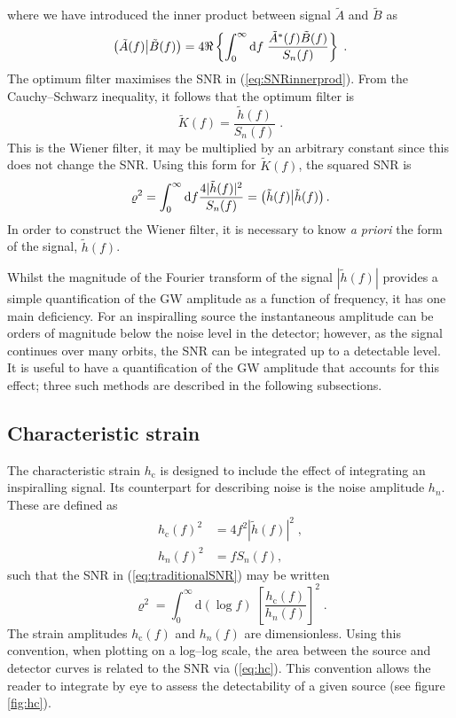 where we have introduced the inner product between signal $\tilde{A}$ and $\tilde{B}$ as \citep{Finn1992}
\begin{equation}\label{eq:snrinnerprod} \left({\tilde{A}(f)}\middle|{\tilde{B}(f)}\right) = 4\Re\left\{\int_{0}^{\infty}\mathrm{d}f\;\frac{\tilde{A}^{*}(f)\tilde{B}(f)}{S_{n}(f)}\right\} \; .\end{equation}
The optimum filter maximises the SNR in (\ref{eq:SNRinnerprod}). From the Cauchy--Schwarz inequality, it follows that the optimum filter is
\begin{equation}
\tilde{K}(f)=\frac{\tilde{h}(f)}{S_{n}(f)} \; .
\end{equation}
This is the Wiener filter, it may be multiplied by an arbitrary constant since this does not change the SNR. Using this form for $\tilde{K}(f)$, the squared SNR is
\begin{equation}
\varrho^2 = \int_0^\infty\mathrm{d}f \frac{4| \tilde{h}(f)|^{2}}{S_n(f)} = \left({\tilde{h}(f)}\middle|{\tilde{h}(f)}\right).
\label{eq:traditionalSNR} 
\end{equation}
In order to construct the Wiener filter, it is necessary to know \emph{a priori} the form of the signal, $\tilde{h}(f)$.

Whilst the magnitude of the Fourier transform of the signal $|\tilde{h}(f)|$ provides a simple quantification of the GW amplitude as a function of frequency, it has one main deficiency. For an inspiralling source the instantaneous amplitude can be orders of magnitude below the noise level in the detector; however, as the signal continues over many orbits, the SNR can be integrated up to a detectable level. It is useful to have a quantification of the GW amplitude that accounts for this effect; three such methods are described in the following subsections.

\subsection{Characteristic strain}\label{sec:character-strain}

The characteristic strain $h_\mathrm{c}$ is designed to include the effect of integrating an inspiralling signal. Its counterpart for describing noise is the noise amplitude $h_n$. These are defined as
\begin{eqnarray}\label{eq:strain-hc} 
h_\mathrm{c}(f)^{2} &= 4f^{2}\left| \tilde{h}(f) \right|^{2} \; ,\\
h_{n}(f)^{2} &= fS_{n}(f),
\label{eq:strain-hn}
\end{eqnarray}
such that the SNR in (\ref{eq:traditionalSNR}) may be written
\begin{equation}\label{eq:hc} 
\varrho^{2} = \int_{0}^{\infty} \mathrm{d}\left(\log f\right)\; \left[\frac{h_\mathrm{c}(f)}{h_{n}(f)}\right]^{2} \;.
\end{equation}
The strain amplitudes $h_\mathrm{c}(f)$ and $h_{n}(f)$ are dimensionless. Using this convention, when plotting on a log--log scale, the area between the source and detector curves is related to the SNR via (\ref{eq:hc}). This convention allows the reader to integrate by eye to assess the detectability of a given source (see figure \ref{fig:hc}).

